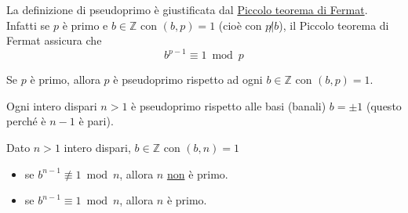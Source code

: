 \documentclass[a4paper,12pt, oneside]{book}
\begin{document}
			\begin{osservazione}
				La definizione di pseudoprimo è giustificata dal \underline{Piccolo teorema di Fermat}.\\
				Infatti se $p$ è primo e $b \in \mathbb{Z}$ con $(b,p)=1$ (cioè con $p \not | b$), il Piccolo teorema di Fermat assicura che
				$$b^{p-1} \equiv 1 \bmod p$$
			\end{osservazione}
			
			\begin{osservazione}
				Se $p$ è primo, allora $p$ è pseudoprimo rispetto ad ogni $b \in \mathbb{Z}$ con $(b,p)=1$.
			\end{osservazione}
			
			\begin{osservazione}
				Ogni intero dispari $n>1$ è pseudoprimo rispetto alle basi (banali) $b=\pm1$ (questo perché è $n-1$ è pari).
			\end{osservazione}
			
			\begin{nota}
				Dato $n>1$ intero dispari, $b \in \mathbb{Z}$ con $(b,n)=1$
				\begin{itemize}
					\item se $b^{n-1} \not\equiv 1 \bmod n$, allora $n$ \underline{non} è primo.
					\item se $b^{n-1} \equiv 1 \bmod n$, allora $n$ è primo.
				\end{itemize}
			\end{nota}
			
\end{document}
